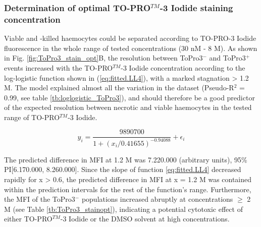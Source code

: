 \subsubsection{Determination of optimal TO-PRO$^{TM}$-3 Iodide staining concentration}
Viable and -killed haemocytes could be separated according to TO-PRO-3 Iodide fluorescence in the whole range of tested concentrations (30 nM - 8 \micro M). As shown in Fig. \ref{fig:ToPro3_stain_opt}B, the resolution between ToPro3$^{-}$ and ToPro3$^{+}$ events increased with the TO-PRO$^{TM}$-3 Iodide concentration according to the log-logistic function shown in (\ref{eq:fitted.LL4}), with a marked stagnation > 1.2 \micro M. The model explained almost all the variation in the dataset (Pseudo-R$^{2}$ = 0.99, see table \ref{tb:loglogistic_ToPro3}), and should therefore be a good predictor of the expected resolution between necrotic and viable haemocytes in the tested range of TO-PRO$^{TM}$-3 Iodide.

\begin{equation}
\label{eq:fitted.LL4}
y_{i} = \dfrac{9890700}{1 + (x_i / 0.41655)^{-0.94088}} + \epsilon_i
\end{equation}

The predicted difference in MFI at 1.2 \micro M was 7.220.000 (arbitrary units), 95\% PI[6.170.000, 8.260.000]. Since the slope of function \ref{eq:fitted.LL4} decreased rapidly for x > 0.6, the predicted difference in MFI at x = 1.2 \micro M was contained within the prediction intervals for the rest of the function's range. Furthermore, the MFI of the ToPro3$^{-}$ populations increased abruptly at concentrations $\geq$ 2 \micro M (see Table \ref{tb:ToPro3_stainopt}), indicating a potential cytotoxic effect of either TO-PRO$^{TM}$-3 Iodide or the DMSO solvent at high concentrations.

